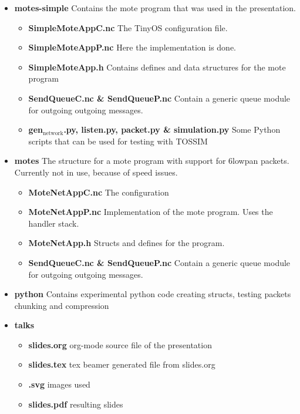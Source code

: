 \documentclass[11pt]{article}
\begin{document}
\begin{itemize}
\item \textbf{motes-simple}
    Contains the mote program that was used in the presentation.

\begin{itemize}
\item \textbf{SimpleMoteAppC.nc}
      The TinyOS configuration file.
\item \textbf{SimpleMoteAppP.nc}
      Here the implementation is done.
\item \textbf{SimpleMoteApp.h}
      Contains defines and data structures for the mote program
\item \textbf{SendQueueC.nc \& SendQueueP.nc}
      Contain a generic queue module for outgoing outgoing messages.
\item \textbf{gen$_{\mathrm{network}}$.py, listen.py, packet.py \& simulation.py}
      Some Python scripts that can be used for testing with TOSSIM
\end{itemize}

\item \textbf{motes}
    The structure for a mote program with support for 6lowpan packets.
    Currently not in use, because of speed issues.

\begin{itemize}
\item \textbf{MoteNetAppC.nc}
      The configuration
\item \textbf{MoteNetAppP.nc}
      Implementation of the mote program. Uses the handler stack.
\item \textbf{MoteNetApp.h}
      Structs and defines for the program.
\item \textbf{SendQueueC.nc \& SendQueueP.nc}
      Contain a generic queue module for outgoing outgoing messages.
\end{itemize}

\item \textbf{python}
    Contains experimental python code creating structs, testing packets chunking and compression
\item \textbf{talks}

\begin{itemize}
\item \textbf{slides.org}
      org-mode source file of the presentation
\item \textbf{slides.tex}
      tex beamer generated file from slides.org
\item \textbf{.svg}
      images used
\item \textbf{slides.pdf}
      resulting slides
\end{itemize}

\end{itemize}
\end{document}
